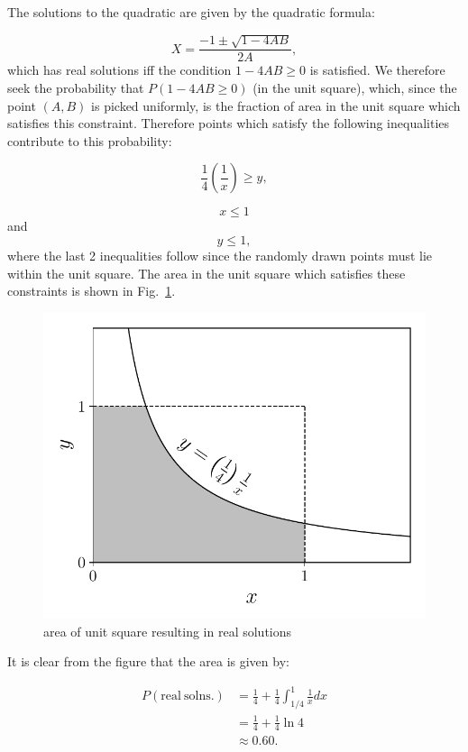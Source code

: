 \begin{problem}{19} The solutions to the quadratic are given by the quadratic formula:

	\begin{equation}
		X = \frac{-1 \pm \sqrt{1-4AB}}{2A},
	\end{equation}
	which has real solutions iff the condition $1-4AB \ge 0$ is satisfied.  We therefore seek the probability that $P(1-4AB\ge 0)$ (in the unit square), which, since the point $(A, B)$ is picked uniformly, is the fraction of area in the unit square which satisfies this constraint.  Therefore points which satisfy the following inequalities contribute to this probability:

	\begin{equation*}
		\frac{1}{4} \left(\frac{1}{x} \right)\ge y,
	\end{equation*}
	
	\begin{equation*}
		x\le1
	\end{equation*}
	and
		\begin{equation*}
		y\le1,
	\end{equation*}
where the last 2 inequalities follow since the randomly drawn points must lie within the unit square.  The area in the unit square which satisfies these constraints is shown in Fig.~\ref{fig:prob_19}.


	\begin{figure}[t]
	\centering
      		 \includegraphics[totalheight=6cm]{chpt1/prob19.pdf}
  			  \caption{area of unit square resulting in real solutions}
    			   \label{fig:prob_19}
	\end{figure}
It is clear from the figure that the area is given by:

\begin{align*}
	P(\mathrm{real~solns.}) & = \frac{1}{4} +\frac{1}{4}\int_{1/4}^1\frac{1}{x} dx \\
	& = \frac{1}{4}+\frac{1}{4} \ln 4 \\
	& \approx 0.60.
\end{align*}
	
\end{problem} 


